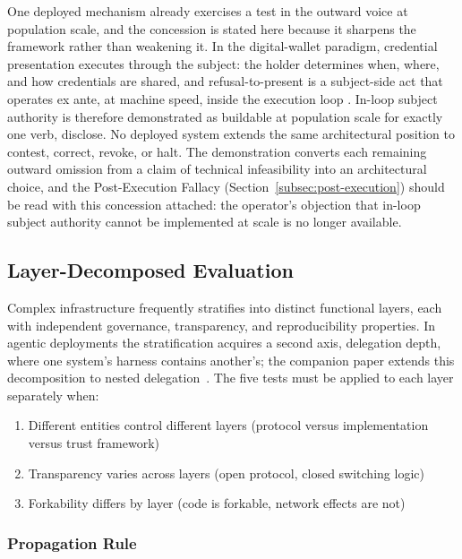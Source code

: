 \documentclass{article}
\begin{document}
One deployed mechanism already exercises a test in the outward voice at population scale, and the concession is stated here because it sharpens the framework rather than weakening it. In the digital-wallet paradigm, credential presentation executes through the subject: the holder determines when, where, and how credentials are shared, and refusal-to-present is a subject-side act that operates ex ante, at machine speed, inside the execution loop \citep{worldbank2026wallets}. In-loop subject authority is therefore demonstrated as buildable at population scale for exactly one verb, disclose. No deployed system extends the same architectural position to contest, correct, revoke, or halt. The demonstration converts each remaining outward omission from a claim of technical infeasibility into an architectural choice, and the Post-Execution Fallacy (Section~\ref{subsec:post-execution}) should be read with this concession attached: the operator's objection that in-loop subject authority cannot be implemented at scale is no longer available.

\subsection{Layer-Decomposed Evaluation}
\label{subsec:layers}

Complex infrastructure frequently stratifies into distinct functional layers, each with independent governance, transparency, and reproducibility properties. In agentic deployments the stratification acquires a second axis, delegation depth, where one system's harness contains another's; the companion paper extends this decomposition to nested delegation~\citep{aravind2026epi}. The five tests must be applied to each layer separately when:

\begin{enumerate}[noitemsep,topsep=0pt]
    \item Different entities control different layers (protocol versus implementation versus trust framework)
    \item Transparency varies across layers (open protocol, closed switching logic)
    \item Forkability differs by layer (code is forkable, network effects are not)
\end{enumerate}

\subsubsection{Propagation Rule}
\end{document}
